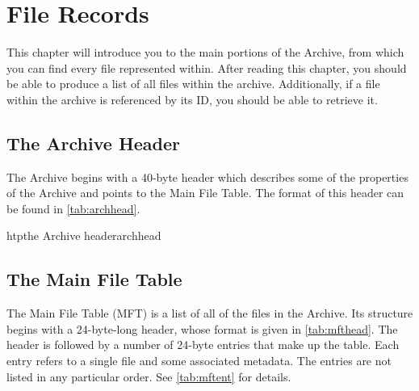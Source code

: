 \chapter{File Records}
\label{chap:filerecords}

This chapter will introduce you to the main portions of the Archive, from which 
you can find every file represented within.  After reading this chapter, you
should be able to produce a list of all files within the archive.  Additionally,
if a file within the archive is referenced by its ID, you should be able to
retrieve it.

\section{The Archive Header}
\label{sec:archhead}

The Archive begins with a 40-byte header which describes some of the properties
of the Archive and points to the Main File Table.  The format of this header
can be found in \autoref{tab:archhead}.

\begin{datastructure}{htp}{the Archive header}{archhead}
\end{datastructure}

\section{The Main File Table}
\label{sec:mft}

The Main File Table (MFT) is a list of all of the files in the Archive.  Its
structure begins with a 24-byte-long header, whose format is given in
\autoref{tab:mfthead}.  The header is followed by a number of 24-byte entries
that make up the table.  Each entry refers to a single file and some associated
metadata.  The entries are not listed in any particular order.  See
\autoref{tab:mftent} for details.

